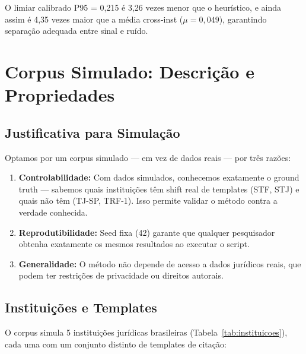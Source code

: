 \documentclass[12pt,a4paper]{article}
\theoremstyle{remark}
\begin{document}
O limiar calibrado P95 = 0,215 é 3,26 vezes menor que o heurístico, e ainda assim é 4,35 vezes maior que a média cross-inst ($\mu = 0,049$), garantindo separação adequada entre sinal e ruído.

\newpage

\section{Corpus Simulado: Descrição e Propriedades}

\subsection{Justificativa para Simulação}

Optamos por um corpus simulado — em vez de dados reais — por três razões:

\begin{enumerate}[label=(\roman*), nosep]
  \item \textbf{Controlabilidade:} Com dados simulados, conhecemos exatamente o ground truth — sabemos quais instituições têm shift real de templates (STF, STJ) e quais não têm (TJ-SP, TRF-1). Isso permite validar o método contra a verdade conhecida.
  \item \textbf{Reprodutibilidade:} Seed fixa (42) garante que qualquer pesquisador obtenha exatamente os mesmos resultados ao executar o script.
  \item \textbf{Generalidade:} O método não depende de acesso a dados jurídicos reais, que podem ter restrições de privacidade ou direitos autorais.
\end{enumerate}

\subsection{Instituições e Templates}

O corpus simula 5 instituições jurídicas brasileiras (Tabela~\ref{tab:instituicoes}), cada uma com um conjunto distinto de templates de citação:
\end{document}
